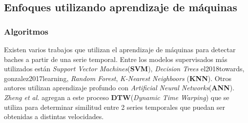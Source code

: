 
	\subsection{Enfoques utilizando aprendizaje de máquinas}
		\subsubsection{Algoritmos}
			Existen varios trabajos que utilizan el aprendizaje de máquinas para detectar baches a partir de una serie temporal. Entre los modelos
			supervisados más utilizados están \emph{Support Vector Machines}(\textbf{SVM}), \emph{Decision Trees}\brackcite
			{el2018towards, gonzalez2017learning}, \emph{Random Forest}, \emph{K-Nearest Neighboors}
			(\textbf{KNN}). Otros autores utilizan aprendizaje profundo con
			\emph{Artificial Neural Networks}(\textbf{ANN}).
			\emph{Zheng et al.} agregan a este proceso \textbf{DTW}(\emph{Dynamic Time Warping}) que se utiliza
			para determinar similitud entre 2 series temporales que puedan ser obtenidas a distintas velocidades.

